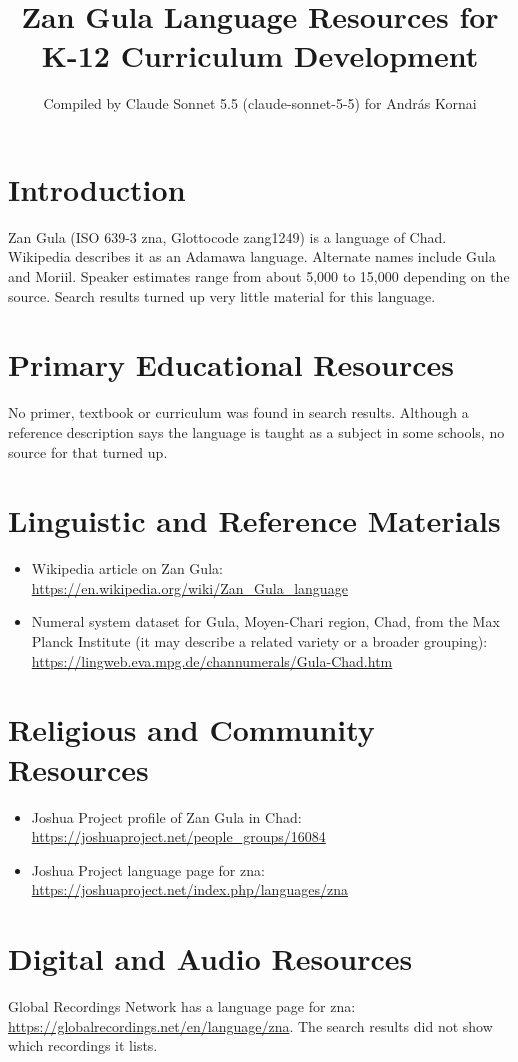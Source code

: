 \documentclass[12pt]{article}
\title{Zan Gula Language Resources for K-12 Curriculum Development}
\author{Compiled by Claude Sonnet 5.5 (claude-sonnet-5-5) for Andr\'as Kornai}
\date{}
\begin{document}
\maketitle

\section{Introduction}
Zan Gula (ISO 639-3 zna, Glottocode zang1249) is a language of Chad. Wikipedia describes it as an Adamawa language. Alternate names include Gula and Moriil. Speaker estimates range from about 5,000 to 15,000 depending on the source. Search results turned up very little material for this language.

\section{Primary Educational Resources}
No primer, textbook or curriculum was found in search results. Although a reference description says the language is taught as a subject in some schools, no source for that turned up.

\section{Linguistic and Reference Materials}
\begin{itemize}
\item Wikipedia article on Zan Gula: \url{https://en.wikipedia.org/wiki/Zan_Gula_language}
\item Numeral system dataset for Gula, Moyen-Chari region, Chad, from the Max Planck Institute (it may describe a related variety or a broader grouping): \url{https://lingweb.eva.mpg.de/channumerals/Gula-Chad.htm}
\end{itemize}

\section{Religious and Community Resources}
\begin{itemize}
\item Joshua Project profile of Zan Gula in Chad: \url{https://joshuaproject.net/people_groups/16084}
\item Joshua Project language page for zna: \url{https://joshuaproject.net/index.php/languages/zna}
\end{itemize}

\section{Digital and Audio Resources}
Global Recordings Network has a language page for zna: \url{https://globalrecordings.net/en/language/zna}. The search results did not show which recordings it lists.
\end{document}
